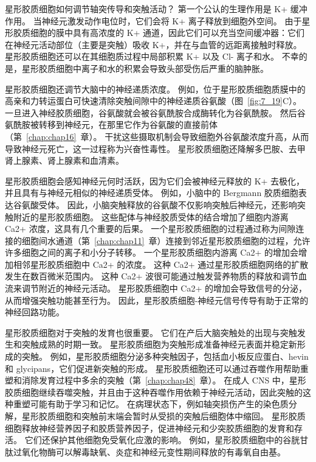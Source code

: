 星形胶质细胞如何调节轴突传导和突触活动？
第一个公认的生理作用是 K+ 缓冲作用。
当神经元激发动作电位时，它们会将 K+ 离子释放到细胞外空间。
由于星形胶质细胞的膜中具有高浓度的 K+ 通道，因此它们可以充当空间缓冲器：它们在神经元活动部位（主要是突触）吸收 K+，并在与血管的远距离接触时释放。
星形胶质细胞还可以在其细胞质过程中局部积累 K+ 以及 Cl- 离子和水。
不幸的是，星形胶质细胞中离子和水的积累会导致头部受伤后严重的脑肿胀。


星形胶质细胞还调节大脑中的神经递质浓度。
例如，位于星形胶质细胞质膜中的高亲和力转运蛋白可快速清除突触间隙中的神经递质谷氨酸（图~\ref{fig:7_19}C）。
一旦进入神经胶质细胞，谷氨酸就会被谷氨酰胺合成酶转化为谷氨酰胺。
然后谷氨酰胺被转移到神经元，在那里它作为谷氨酸的直接前体（第~\ref{chap:chap16}~章）。
干扰这些摄取机制会导致细胞外谷氨酸浓度升高，从而导致神经元死亡，这一过程称为兴奋性毒性。
星形胶质细胞还降解多巴胺、去甲肾上腺素、肾上腺素和血清素。


星形胶质细胞会感知神经元何时活跃，因为它们会被神经元释放的 K+ 去极化，并且具有与神经元相似的神经递质受体。
例如，小脑中的 Bergmann 胶质细胞表达谷氨酸受体。 
因此，小脑突触释放的谷氨酸不仅影响突触后神经元，还影响突触附近的星形胶质细胞。
这些配体与神经胶质受体的结合增加了细胞内游离 Ca2+ 浓度，这具有几个重要的后果。
一个星形胶质细胞的过程通过称为间隙连接的细胞间水通道（第~\ref{chap:chap11}~章）连接到邻近星形胶质细胞的过程，允许许多细胞之间的离子和小分子转移。 
一个星形胶质细胞内游离 Ca2+ 的增加会增加相邻星形胶质细胞中 Ca2+ 的浓度。
这种 Ca2+ 通过星形胶质细胞网络的扩散发生在数百微米范围内。
这种 Ca2+ 波很可能通过触发营养物质的释放和调节血流来调节附近的神经元活动。
星形胶质细胞中 Ca2+ 的增加会导致信号的分泌，从而增强突触功能甚至行为。
因此，星形胶质细胞-神经元信号传导有助于正常的神经回路功能。


星形胶质细胞对于突触的发育也很重要。
它们在产后大脑突触处的出现与突触发生和突触成熟的时期一致。
星形胶质细胞为突触形成准备神经元表面并稳定新形成的突触。
例如，星形胶质细胞分泌多种突触因子，包括血小板反应蛋白、hevin 和 glycipans，它们促进新突触的形成。
星形胶质细胞还可以通过吞噬作用帮助重塑和消除发育过程中多余的突触（第~\ref{chap:chap48}~章）。
在成人 CNS 中，星形胶质细胞继续吞噬突触，并且由于这种吞噬作用依赖于神经元活动，因此突触的这种重塑可能有助于学习和记忆。
在病理状态下，例如轴突损伤产生的染色质分解，星形胶质细胞和突触前末端会暂时从受损的突触后细胞体中缩回。
星形胶质细胞释放神经营养因子和胶质营养因子，促进神经元和少突胶质细胞的发育和存活。
它们还保护其他细胞免受氧化应激的影响。
例如，星形胶质细胞中的谷胱甘肽过氧化物酶可以解毒缺氧、炎症和神经元变性期间释放的有毒氧自由基。



